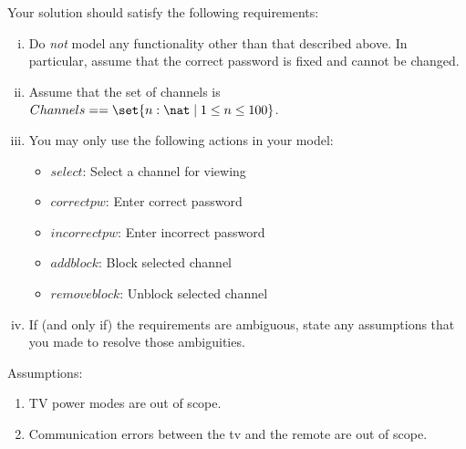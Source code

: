\documentclass{article}
\begin{document}
\begin{enumerate}
Your solution should satisfy the following requirements:
\begin{enumerate}[i.]
\item Do \emph{not} model any functionality other than that described above. In particular, assume that the correct password is fixed and cannot be changed.
\item Assume that the set of channels is $Channels == \set{n:\nat \mid 1 \leq n \leq 100}$.
\item You may only use the following actions in your model:
    \begin{itemize}
    \item $select$: Select a channel for viewing
    \item $correctpw$: Enter correct password
    \item $incorrectpw$: Enter incorrect password
    \item $addblock$: Block selected channel
    \item $removeblock$: Unblock selected channel
    \end{itemize}
  \item If (and only if) the requirements are ambiguous, state any assumptions that you made to resolve those ambiguities. \\
\end{enumerate}
Assumptions:
\begin{enumerate}
\item TV power modes are out of scope.
\item Communication errors between the tv and the remote are out of scope.
\end{enumerate}


\end{enumerate}
\end{document}

